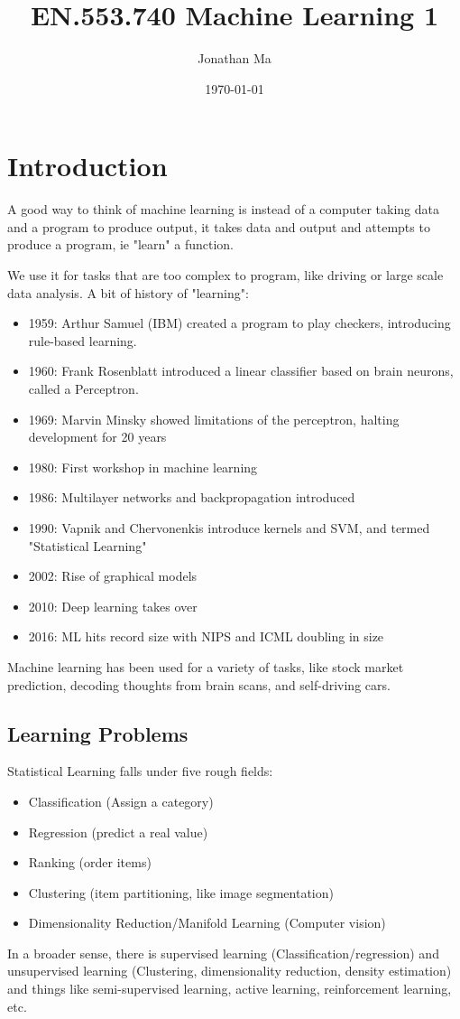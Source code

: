 \documentclass[12pt,oneside]{book}
\title{EN.553.740 Machine Learning 1}
\author{Jonathan Ma}
\date{\today}
\numberwithin{equation}{section}
\theoremstyle{definition}
\theoremstyle{plain}
\theoremstyle{remark}
\begin{document}
\maketitle
\tableofcontents

\section{Introduction}
A good way to think of machine learning is instead of a computer taking data and a program to produce output, it takes data and output and attempts to produce a program, ie "learn" a function.

We use it for tasks that are too complex to program, like driving or large scale data analysis. A bit of history of "learning":
\begin{itemize}
    \item 1959: Arthur Samuel (IBM) created a program to play checkers, introducing rule-based learning.
    \item 1960: Frank Rosenblatt introduced a linear classifier based on brain neurons, called a Perceptron.
    \item 1969: Marvin Minsky showed limitations of the perceptron, halting development for 20 years
    \item 1980: First workshop in machine learning
    \item 1986: Multilayer networks and backpropagation introduced
    \item 1990: Vapnik and Chervonenkis introduce kernels and SVM, and termed "Statistical Learning"
    \item 2002: Rise of graphical models
    \item 2010: Deep learning takes over
    \item 2016: ML hits record size with NIPS and ICML doubling in size
\end{itemize}

Machine learning has been used for a variety of tasks, like stock market prediction, decoding thoughts from brain scans, and self-driving cars.

\subsection{Learning Problems}
Statistical Learning falls under five rough fields:
\begin{itemize}
    \item Classification (Assign a category)
    \item Regression (predict a real value)
    \item Ranking (order items)
    \item Clustering (item partitioning, like image segmentation)
    \item Dimensionality Reduction/Manifold Learning (Computer vision)
\end{itemize}
In a broader sense, there is supervised learning (Classification/regression) and unsupervised learning (Clustering, dimensionality reduction, density estimation) and things like semi-supervised learning, active learning, reinforcement learning, etc.
\end{document}
